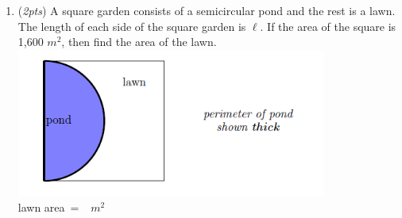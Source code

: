 \documentclass[12pt]{article}
\newcommand{\ansbox}[2]{\raisebox{-.5\height}{\framebox(#1,#2){}}}
\begin{document}
\begin{enumerate}
\newpage
\item ({\it 2pts}) A square garden consists of a semicircular pond and the rest is a lawn. The length of each side of the square garden is $\ell$. If the area of the square is 1,600 $m^2$, then find the area of the lawn.  
\\
{\includegraphics[width=4in]{Midterm_2_Pond_Screenshot.png} }
\vfill \\ 
\phantom{.} \hfill lawn area$ \ = \ $ \ansbox{200}{70}$\ m^2$ 
















\end{enumerate}
\end{document}
